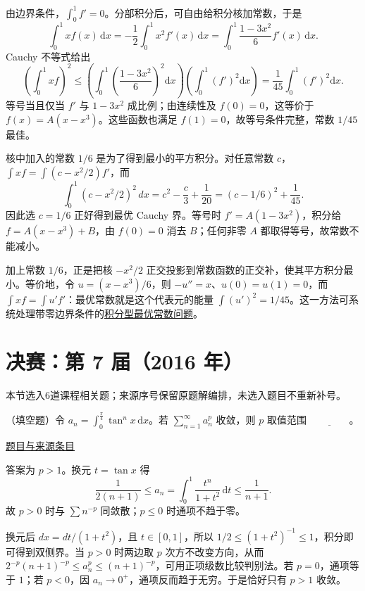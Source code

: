 \documentclass[UTF8,12pt,a4paper,fontset=fandol]{ctexart}
\begin{document}
\begin{solve}\label{ans:fin06-lo:9}

由边界条件，$\int_0^1f'=0$。分部积分后，可自由给积分核加常数，于是
\[
\int_0^1xf(x)\,\mathrm dx
=-\frac12\int_0^1x^2f'(x)\,\mathrm dx
=\int_0^1\frac{1-3x^2}{6}f'(x)\,\mathrm dx.
\]
Cauchy 不等式给出
\[
\left(\int_0^1xf\right)^2
\le\left(\int_0^1\left(\frac{1-3x^2}{6}\right)^2\mathrm dx\right)
\left(\int_0^1(f')^2\mathrm dx\right)
=\frac1{45}\int_0^1(f')^2\mathrm dx.
\]
等号当且仅当 $f'$ 与 $1-3x^2$ 成比例；由连续性及 $f(0)=0$，这等价于 $f(x)=A(x-x^3)$。这些函数也满足 $f(1)=0$，故等号条件完整，常数 $1/45$ 最佳。

核中加入的常数 $1/6$ 是为了得到最小的平方积分。对任意常数 $c$，$\int xf=\int(c-x^2/2)f'$，而
\[
\int_0^1(c-x^2/2)^2\,dx=c^2-\frac c3+\frac1{20}
=(c-1/6)^2+\frac1{45}.
\]
因此选 $c=1/6$ 正好得到最优 Cauchy 界。等号时 $f'=A(1-3x^2)$，积分给 $f=A(x-x^3)+B$，由 $f(0)=0$ 消去 $B$；任何非零 $A$ 都取得等号，故常数不能减小。

\end{solve}

\begin{remark}[方法与条件]加上常数 $1/6$，正是把核 $-x^2/2$ 正交投影到常数函数的正交补，使其平方积分最小。等价地，令 $u=(x-x^3)/6$，则 $-u''=x$、$u(0)=u(1)=0$，而 $\int xf=\int u'f'$：最优常数就是这个代表元的能量 $\int(u')^2=1/45$。这一方法可系统处理带零边界条件的\hyperref[app:inequality-energy]{积分型最优常数问题}。\end{remark}

\section{决赛：第 7 届（2016 年）}

本节选入6道课程相关题；来源序号保留原题解编排，未选入题目不重新补号。

\begin{example}[来源序号2]\label{ex:fin07-hi:2}\label{pr:fin07-hi:2}

（填空题）令 $a_{n}=\int_{0}^{\frac{\pi}{4}}\tan^{n}x\,\mathrm{d}x$。若 $\sum_{n=1}^{\infty}a_{n}^{p}$ 收敛，则 $p$ 取值范围 $\underline{\qquad\qquad}$。

\par\href{https://github.com/lzxcr/cmc-mathematics/blob/64916fa1fdbc3e444a652eca204d5669058ee321/src/problems/finals/07/02.md}{题目与来源条目}

\end{example}

\begin{solve}\label{ans:fin07-hi:2}

答案为 $p>1$。换元 $t=\tan x$ 得
\[
\frac{1}{2(n+1)}\leq a_n=\int_0^1\frac{t^n}{1+t^2}\,\mathrm{d}t\leq\frac{1}{n+1}.
\]
故 $p>0$ 时与 $\sum n^{-p}$ 同敛散；$p\leq0$ 时通项不趋于零。

换元后 $dx=dt/(1+t^2)$，且 $t\in[0,1]$，所以 $1/2\le(1+t^2)^{-1}\le1$，积分即可得到双侧界。当 $p>0$ 时两边取 $p$ 次方不改变方向，从而 $2^{-p}(n+1)^{-p}\le a_n^p\le(n+1)^{-p}$，可用正项级数比较判别法。若 $p=0$，通项等于 $1$；若 $p<0$，因 $a_n\to0^+$，通项反而趋于无穷。于是恰好只有 $p>1$ 收敛。

\end{solve}
\end{document}
